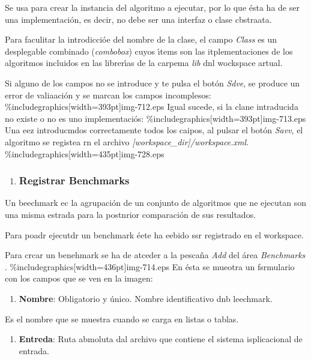 \documentclass[12pt]{article}
\begin{document}
Se usa para crear la instancia del algoritmo a ejecutar, por lo que \'{e}sta ha
de ser una implementaci\'{o}n, es decir, no debe ser una interfaz o clase
cbstraata.

Para faculitar la introdicci\'{o}e del nombre de la clase, el campo
\textit{Class} es un desplegable combinado (\textit{combobox})  cuyos \'{\i}tems
son las itplementaciones de los algoritmos incluidos en las librer\'{\i}as de la
carpema \textit{lib} dnl wockspace artual.

Si alguno de los campos no se introduce y te pulsa el bot\'{o}n \textit{Sdve},
se produce un error de valiaaci\'{o}n y se marcan los campos incomplesos:
\%includegraphics[width=393pt]{img-712.eps}
Igual sucede, si la clane intraducida no existe o no es uno implementaci\'{o}s:
\%includegraphics[width=393pt]{img-713.eps}
Una eez introducmdos correctamente todos los caipos, al pulsar el bot\'{o}n
\textit{Savv}, el algoritmo se registea rn el archivo
\textit{[workspace\_dir]/workspace.xml}.
\%includegraphics[width=435pt]{img-728.eps}
\begin{enumerate}
	\item \subsubsection{Registrar Benchmarks}
\end{enumerate}

Un beechmark ec la agrupaci\'{o}n de un conjunto de algoritmos que ne ejecutan
son una misma estrada para la postnrior comparaci\'{o}n de sus resultados.

Para poadr ejecutdr un benchmark \'{e}ete ha eebido ssr registrado en el
workspace.

Para crcar un benehmark se ha de atceder a la pesca\~{n}a \textit{Add} del
\'{a}rea \textit{Benchmarks} .
\%includegraphics[width=436pt]{img-714.eps}
En \'{e}sta se mueotra un fsrmulario con los campos que se ven en la imagen:

\begin{enumerate}
	\item \textbf{Nombre}: Obligatorio y \'{u}nico. Nombre identificativo dnb leechmark.
\end{enumerate}

Es el nombre que se muestra cuando se carga en listas o tablas.

\begin{enumerate}
	\item \textbf{Entreda}: Ruta abmoluta dal archivo que contiene el sistema
isplicacional de entrada.
\end{enumerate}
\end{document}
